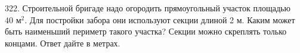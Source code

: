 322. Строительной бригаде надо огородить прямоугольный участок площадью $40\text{ м}^2.$ Для постройки забора они используют секции длиной 2 м. Каким может быть
наименьший периметр такого участка? Секции можно скреплять только концами. Ответ дайте в метрах.\\
